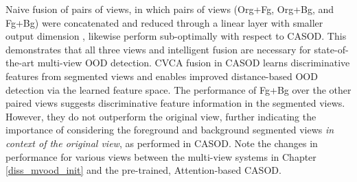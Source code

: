 Naive fusion of pairs of views, in which pairs of views (Org+Fg, Org+Bg, and Fg+Bg) were concatenated and reduced through a linear layer with smaller output dimension \citep{seeland2021multi}, likewise perform sub-optimally with respect to CASOD. This demonstrates that all three views and intelligent fusion are necessary for state-of-the-art multi-view OOD detection. CVCA fusion in CASOD learns discriminative features from segmented views and enables improved distance-based OOD detection via the learned feature space. The performance of Fg+Bg over the other paired views suggests discriminative feature information in the segmented views. However, they do not outperform the original view, further indicating the importance of considering the foreground and background segmented views \textit{in context of the original view}, as performed in CASOD. Note the changes in performance for various views between the multi-view systems in Chapter \ref{diss_mvood_init} and the pre-trained, Attention-based CASOD.


